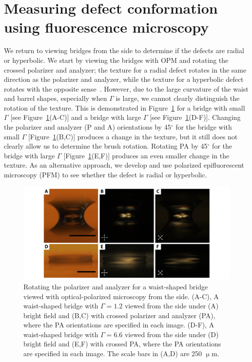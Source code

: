\section{Measuring defect conformation using fluorescence microscopy}
We return to viewing bridges from the side to determine if the defects are radial or hyperbolic.
We start by viewing the bridges with OPM and rotating the crossed polarizer and analyzer; the texture for a radial defect rotates in the same direction as the polarizer and analyzer, while the texture for a hyperbolic defect rotates with the opposite sense~\cite{RN177}.
However, due to the large curvature of the waist and barrel shapes, especially when $\Gamma$ is large, we cannot clearly distinguish the rotation of the texture.
This is demonstrated in Figure~\ref{f:5-PA_Rot} for a bridge with small $\Gamma$ [see Figure~\ref{f:5-PA_Rot}(A-C)] and a bridge with large $\Gamma$ [see Figure~\ref{f:5-PA_Rot}(D-F)].
Changing the polarizer and analyzer (P and A) orientations by 45$^{\circ}$ for the bridge with small $\Gamma$ [Figure~\ref{f:5-PA_Rot}(B,C)] produces a change in the texture, but it still does not clearly allow us to determine the brush rotation.
Rotating PA by 45$^{\circ}$ for the bridge with large $\Gamma$ [Figure~\ref{f:5-PA_Rot}(E,F)] produces an even smaller change in the texture.
As an alternative approach, we develop and use polarized epifluorescent microscopy (PFM) to see whether the defect is radial or hyperbolic.
\begin{figure}
  \centering
  \includegraphics{figures/C5/Ch5-Figs_PA_Rot.png}
  \caption{Rotating the polarizer and analyzer for a waist-shaped bridge viewed with optical-polarized microscopy from the side.
  (A-C), A waist-shaped bridge with $\Gamma = 1.2$ viewed from the side under (A) bright field and (B,C) with crossed polarizer and analyzer (PA), where the PA orientations are specified in each image.
  (D-F), A waist-shaped bridge with $\Gamma = 6.6$ viewed from the side under (D) bright field and (E,F) with crossed PA, where the PA orientations are specified in each image.
  The scale bars in (A,D) are 250 $\upmu$m.}\label{f:5-PA_Rot}
\end{figure}

